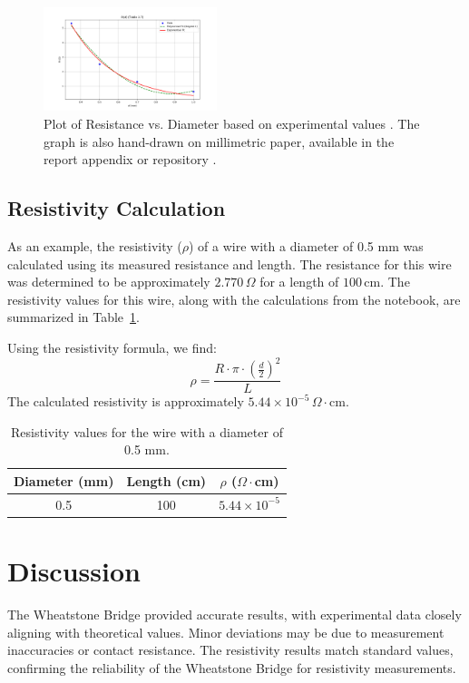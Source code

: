\documentclass[journal]{IEEEtran}
\begin{document}
\begin{figure}[H]
    \centering
    \includegraphics[width=0.45\textwidth]{output_plots/resistance_vs_diameter_table_2_7.png} %
    \caption{Plot of Resistance vs. Diameter based on experimental values \cite{lab_manual}. The graph is also hand-drawn on millimetric paper, available in the report appendix or repository \cite{graphonmillimetricpaper}.}
    \label{fig:resistance_vs_diameter}
\end{figure}

\subsection{Resistivity Calculation}
As an example, the resistivity (\(\rho\)) of a wire with a diameter of 0.5 mm was calculated using its measured resistance and length. The resistance for this wire was determined to be approximately \(2.770 \, \Omega\) for a length of \(100 \, \text{cm}\). The resistivity values for this wire, along with the calculations from the notebook, are summarized in Table~\ref{tab:resistivity}.

Using the resistivity formula, we find:
\[
\rho = \frac{R \cdot \pi \cdot \left(\frac{d}{2}\right)^2}{L}
\]
The calculated resistivity is approximately \(5.44 \times 10^{-5} \, \Omega \cdot \text{cm}\).

\begin{table}[H]
\centering
\begin{tabular}{ccc}
\hline
Diameter (mm) & Length (cm) & $\rho$ ($\Omega\cdot$cm)\\
\hline
0.5 & 100 & \(5.44 \times 10^{-5}\) \\ %
\hline
\end{tabular}
\caption{Resistivity values for the wire with a diameter of 0.5 mm.}
\label{tab:resistivity}
\end{table}


\section{Discussion}
The Wheatstone Bridge provided accurate results, with experimental data closely aligning with theoretical values. Minor deviations may be due to measurement inaccuracies or contact resistance. The resistivity results match standard values, confirming the reliability of the Wheatstone Bridge for resistivity measurements.
\end{document}
